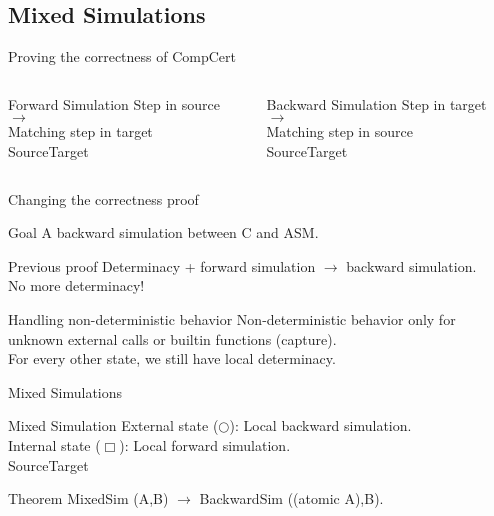 \subsection{Mixed Simulations}
\begin{frame}{Proving the correctness of CompCert}
  \begin{columns}[T] %
    \begin{column}{.48\textwidth}
      \begin{block}{Forward Simulation}
        Step in source $\rightarrow$\\ Matching step in target\\
        {\color{blue}Source\hfill\color{red}Target}
        \forward
      \end{block}
    \end{column}%
    \hfill%
    \begin{column}{.48\textwidth}
      \begin{block}{Backward Simulation}
        Step in target $\rightarrow$\\ Matching step in source\\
        {\color{blue}Source\hfill\color{red}Target}
        \backward
      \end{block}
    \end{column}%
  \end{columns}
\end{frame}

\begin{frame}{Changing the correctness proof}
  \begin{exampleblock}{Goal}
    A backward simulation between C and ASM.
  \end{exampleblock}
  \vfill
  \begin{alertblock}{Previous proof}
    Determinacy + forward simulation $\rightarrow$ backward simulation.\\
    No more determinacy!
  \end{alertblock}
  \vfill
  \begin{exampleblock}{Handling non-deterministic behavior}
    Non-deterministic behavior only for unknown external calls or builtin functions (capture).\\
    For every other state, we still have local determinacy.
  \end{exampleblock}
\end{frame}

\begin{frame}{Mixed Simulations}
  \begin{block}{Mixed Simulation}
    External state ($\bigcirc$): Local backward simulation.\\
    Internal state ($\Box$): Local forward simulation.\\
    {\color{blue}Source\hfill\color{red}Target}
    \vspace{-0.8cm}
    \mixed
  \end{block}
  \vfill
  \begin{block}{Theorem}
    MixedSim (A,B) $\rightarrow$ BackwardSim ((atomic A),B).
  \end{block}
\end{frame}


